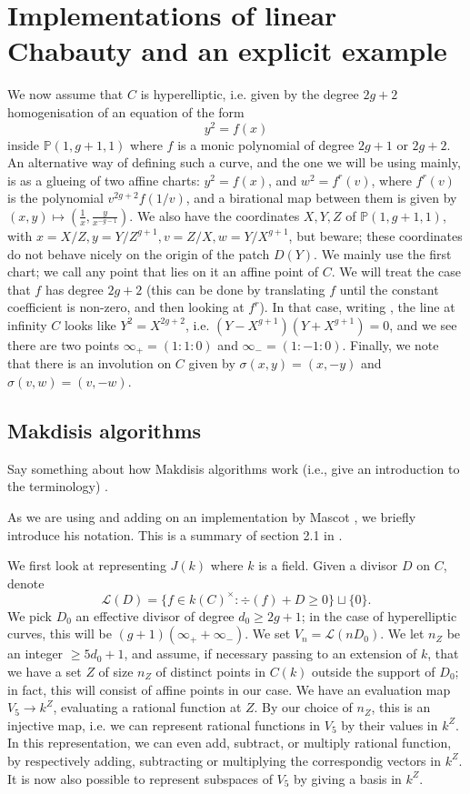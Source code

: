 \documentclass{article}
\newcommand{\Lcal}{\mathcal{L}}
\renewcommand{\P}{\mathbb{P}}
\theoremstyle{plain}
\theoremstyle{definition}
\theoremstyle{remark}
\begin{document}
\section{Implementations of linear Chabauty and an explicit example}
We now assume that $C$ is hyperelliptic, i.e. given by the degree $2g+2$ homogenisation of an equation of the form
\[
y^2 = f(x)
\]
inside $\P(1,g+1,1)$ where $f$ is a monic polynomial of degree $2g+1$ or $2g+2$. An alternative way of defining such a curve, and the one we will be using mainly, is as a glueing of two affine charts: $y^2 = f(x)$, and $w^2 = f^{r}(v)$, where $f^{r}(v)$ is the polynomial $v^{2g + 2} f(1/v)$, and a birational map between them is given by $(x,y) \mapsto (\frac{1}{x},\frac{y}{x^{-g-1}})$. We also have the coordinates $X,Y,Z$ of $\P(1,g+1,1)$, with $x = X/Z, y = Y/Z^{g+1}, v = Z/X, w = Y/X^{g+1}$, but beware; these coordinates do not behave nicely on the origin of the patch $D(Y)$. We mainly use the first chart; we call any point that lies on it an affine point of $C$. We will treat the case that $f$ has degree $2g+2$ (this can be done by translating $f$ until the constant coefficient is non-zero, and then looking at $f^r$). In that case, writing , the line at infinity $C$ looks like $Y^2 = X^{2g+2}$, i.e. $(Y-X^{g+1})(Y+X^{g+1}) = 0$, and we see there are two points $\infty_+ = (1:1:0)$ and $\infty_- = (1:-1:0)$. Finally, we note that there is an involution on $C$ given by $\sigma(x,y) = (x,-y)$ and $\sigma(v,w) = (v,-w)$.

\subsection{Makdisis algorithms}
Say something about how Makdisis algorithms work (i.e., give an introduction to the terminology) \cite{makdisi2004}.

As we are using and adding on an implementation by Mascot \cite{mascot2018}, we briefly introduce his notation. This is a summary of section 2.1 in \cite{mascot2018}.

We first look at representing $J(k)$ where $k$ is a field. Given a divisor $D$ on $C$, denote
\[
\Lcal(D) = \{f \in k(C)^\times : \div(f) + D \geq 0 \} \sqcup \{0\}.
\]
We pick $D_0$ an effective divisor of degree $d_0 \geq 2g+1$; in the case of hyperelliptic curves, this will be $(g+1)(\infty_+ + \infty_-)$. We set $V_n = \Lcal(nD_0)$. We let $n_Z$ be an integer $\geq 5d_0 + 1$, and assume, if necessary passing to an extension of $k$, that we have a set $Z$ of size $n_Z$ of distinct points in $C(k)$ outside the support of $D_0$; in fact, this will consist of affine points in our case. We have an evaluation map $V_5 \to k^Z$, evaluating a rational function at $Z$. By our choice of $n_Z$, this is an injective map, i.e. we can represent rational functions in $V_5$ by their values in $k^Z$. In this representation, we can even add, subtract, or multiply rational function, by respectively adding, subtracting or multiplying the correspondig vectors in $k^Z$. It is now also possible to represent subspaces of $V_5$ by giving a basis in $k^Z$.
\end{document}
